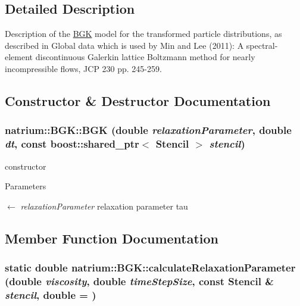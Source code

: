 \subsection{Detailed Description}
Description of the \hyperlink{classnatrium_1_1BGK}{BGK} model for the transformed particle distributions, as described in Global data which is used by Min and Lee (2011): A spectral-\/element discontinuous Galerkin lattice Boltzmann method for nearly incompressible flows, JCP 230 pp. 245-\/259. 

\subsection{Constructor \& Destructor Documentation}
\hypertarget{classnatrium_1_1BGK_adf78ea65d5b96f55dc719b7ab7beb86d}{
\subsubsection[{BGK}]{\setlength{\rightskip}{0pt plus 5cm}natrium::BGK::BGK (double {\em relaxationParameter}, \/  double {\em dt}, \/  const boost::shared\_\-ptr$<$ {\bf Stencil} $>$ {\em stencil})}}
\label{classnatrium_1_1BGK_adf78ea65d5b96f55dc719b7ab7beb86d}


constructor 
\begin{DoxyParams}{Parameters}
\item[\mbox{$\leftarrow$} {\em relaxationParameter}]relaxation parameter tau \end{DoxyParams}


\subsection{Member Function Documentation}
\hypertarget{classnatrium_1_1BGK_a430f5020b6101a64d89a0cc2a246260e}{
\subsubsection[{calculateRelaxationParameter}]{\setlength{\rightskip}{0pt plus 5cm}static double natrium::BGK::calculateRelaxationParameter (double {\em viscosity}, \/  double {\em timeStepSize}, \/  const {\bf Stencil} \& {\em stencil}, \/  double = {})}}
\label{classnatrium_1_1BGK_a430f5020b6101a64d89a0cc2a246260e}


